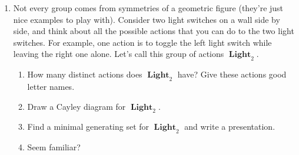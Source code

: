 \documentclass[12pt]{article}
\DeclareMathOperator\Light{\mathbf{Light}}
\begin{document}
\begin{enumerate}[resume]
    \item Not every group comes from symmetries of a geometric figure (they're just nice examples to play with). Consider two light switches on a wall side by side, and think about all the possible actions that you can do to the two light switches. For example, one action is to toggle the left light switch while leaving the right one alone. Let's call this group of actions $\Light_2$.
    \begin{enumerate}[label=\rm{(\alph*)}]
        \item How many distinct actions does $\Light_2$ have? Give these actions good letter names.
        \item Draw a Cayley diagram for $\Light_2$.
        \item Find a minimal generating set for $\Light_2$ and write a presentation.
        \item Seem familiar?
    \end{enumerate}

    
\end{enumerate}

\end{document}

